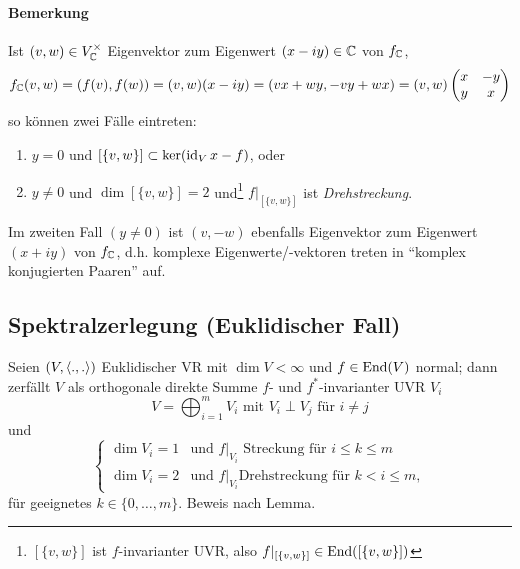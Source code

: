 \paragraph{Bemerkung}
	Ist $ (v,w)\in V_{\mathbb{C}}^\times $ Eigenvektor zum Eigenwert $ (x-iy) \in \mathbb{C} $ von $ f_{\mathbb{C}} $,
		\[ f_{\mathbb{C}}(v,w) = \left(f(v),f(w)\right) = (v,w)(x-iy) = (vx+wy,-vy+wx) = (v,w)
			\begin{pmatrix}
				x & -y\\ y & x
			\end{pmatrix} \]
	so können zwei Fälle eintreten:
		\begin{enumerate}
			\item $ y=0 $ und $ [\{v,w\}] \subset \ker (\operatorname{id}_Vx-f) $, oder
			\item $ y\neq 0 $ und $ \dim [\{v,w\}] = 2 $ und\footnote{$ [\{v,w\}] $ ist $ f $-invarianter UVR, also $ f|_{[\{v,w\}]} \in \operatorname{End}([\{v,w\}])$} $ f|_{[\{v,w\}]} $ ist \emph{Drehstreckung}.
		\end{enumerate}
	Im zweiten Fall $ (y\neq 0) $ ist $ (v,-w) $ ebenfalls Eigenvektor zum Eigenwert $ (x+iy) $ von $ f_{\mathbb{C}} $, d.h. komplexe Eigenwerte/-vektoren treten in "`komplex konjugierten Paaren"' auf.
	
\subsection{Spektralzerlegung (Euklidischer Fall)}
\begin{Satz}
	Seien $ (V,\langle .,. \rangle) $ Euklidischer VR mit $ \dim V <\infty $ und $ f\in \operatorname{End}(V) $ normal; dann zerfällt $ V $ als orthogonale direkte Summe $ f $- und $ f^* $-invarianter UVR $ V_i $
		\[ V = \bigoplus_{i=1}^mV_i \text{ mit } V_i\perp V_j \text{ für } i\neq j \]
	und
		\[ \begin{cases}
			\dim V_i = 1& \text{und } f|_{V_i} \text{ Streckung für } i\leq k\leq m\\
			\dim V_i = 2& \text{und } f|_{V_i} \text{Drehstreckung für }k < i\leq m,
		\end{cases} \]
	für geeignetes $ k\in\{0,\dots,m\} $. Beweis nach Lemma.
\end{Satz}
